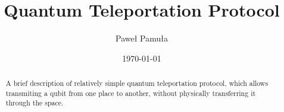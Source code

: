 

\usepackage[utf8]{inputenc}
\usepackage{datetime}
\usepackage{multicol}
\usepackage{enumitem}


\title{Quantum Teleportation Protocol}
\author{Paweł Pamuła}
\date{\mydate\today}

\maketitle

\begin{abstract}
A brief description of relatively simple quantum teleportation protocol, which allows transmiting a qubit from one place to another, without physically transferring it through the space.
\end{abstract}
\vfill
